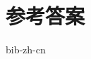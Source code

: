 \documentclass[b5paper]{ctexart}
\begin{document}
\ifx\wholebook\relax \else
\section{参考答案}
\shipoutAnswer

\begin{thebibliography}{99}
{bib-zh-cn}
\end{thebibliography}

\expandafter\enddocument
\fi
\end{document}
